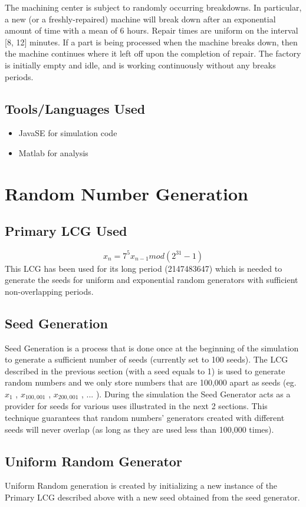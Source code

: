 \documentclass[aps,letterpaper,10pt]{revtex4}
\begin{document}
The machining center is subject to randomly occurring breakdowns. In particular, a new (or a
freshly-repaired) machine will break down after an exponential amount of time with a mean of 6 hours. Repair times are uniform on the interval [8, 12] minutes. If a part is being processed when the machine breaks down, then the machine continues where it left off upon the completion of repair. The factory is initially empty and idle, and is working continuously without any breaks periods.
\subsection{Tools/Languages Used}
    \begin{itemize}
        \item{JavaSE for simulation code}
        \item{Matlab for analysis}
    \end{itemize}

\newpage
\section{Random Number Generation}
\subsection{Primary LCG Used}
    \[x_{n} = 7^5 x_{n-1} mod (2^{31} -1)\]
    This LCG has been used for its long period (2147483647) which is needed to
    generate the seeds for uniform and exponential random generators with
    sufficient non-overlapping periods.
\subsection{Seed Generation}
    Seed Generation is a process that is done once at the beginning of the
    simulation to generate a sufficient number of seeds (currently set to 100
    seeds).
    The LCG described in the previous section (with a seed equals to 1) is used to generate random
    numbers and we only store numbers that are 100,000 apart as seeds (eg.
    $x_{1}$ , $x_{100,001}$ , $x_{200,001}$ , ... ).
    During the simulation the Seed Generator acts as a provider for seeds for
    various uses illustrated in the next 2 sections.
    This technique guarantees that random numbers' generators created with
    different seeds will never overlap (as long as they are used less than
    100,000 times).
\subsection{Uniform Random Generator}
    Uniform Random generation is created by initializing a new instance of the
    Primary LCG described above with a new seed obtained from the seed
    generator.
\end{document}
